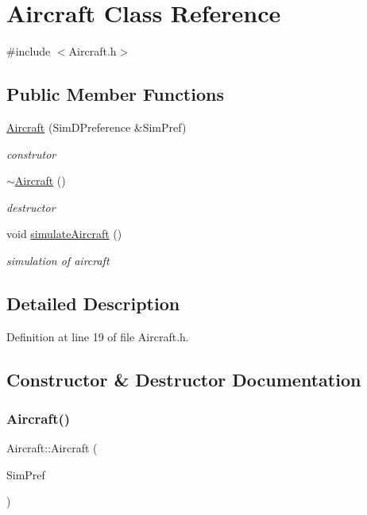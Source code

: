\hypertarget{class_aircraft}{}\section{Aircraft Class Reference}
\label{class_aircraft}


{\ttfamily \#include $<$Aircraft.\+h$>$}

\subsection*{Public Member Functions}
\begin{DoxyCompactItemize}
\item 
\hyperlink{class_aircraft_a1172a5937464c07544b8bee40d379f64}{Aircraft} (Sim\+D\+Preference \&Sim\+Pref)
\begin{DoxyCompactList}\small\item\em construtor \end{DoxyCompactList}\item 
\hyperlink{class_aircraft_aafd3e0af1c6b0b376d3da898d16a4ad1}{$\sim$\+Aircraft} ()
\begin{DoxyCompactList}\small\item\em destructor \end{DoxyCompactList}\item 
void \hyperlink{class_aircraft_afc4b47817c55b981e41c7e6cecdb80df}{simulate\+Aircraft} ()
\begin{DoxyCompactList}\small\item\em simulation of aircraft \end{DoxyCompactList}\end{DoxyCompactItemize}


\subsection{Detailed Description}


Definition at line 19 of file Aircraft.\+h.



\subsection{Constructor \& Destructor Documentation}
\mbox{\label{class_aircraft_a1172a5937464c07544b8bee40d379f64}} 
\subsubsection{\texorpdfstring{Aircraft()}{Aircraft()}}
{\footnotesize\ttfamily Aircraft\+::\+Aircraft (\begin{DoxyParamCaption}\item[{Sim\+D\+Preference \&}]{Sim\+Pref }\end{DoxyParamCaption})}



